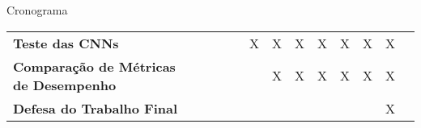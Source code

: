 \begin{frame}{Cronograma}
\begin{table}
\begin{center}
\begin{small}
\begin{tabular}{p{5cm}cccccccccccc}
     \textbf{Teste das CNNs}               &             &             &             &             &      X      &      X      &      X      &      X      &      X      &      X       &     X      \\
     \textbf{Comparação de Métricas
     de Desempenho}                        &             &             &             &             &             &      X      &      X      &      X      &      X      &      X      &      X      \\
     \textbf{Defesa do Trabalho Final}     &             &             &             &             &             &             &             &             &             &             &      X      \\
     \bottomrule
   \end{tabular}
   \end{small}
   \end{center}
   \end{table}
\end{frame}
